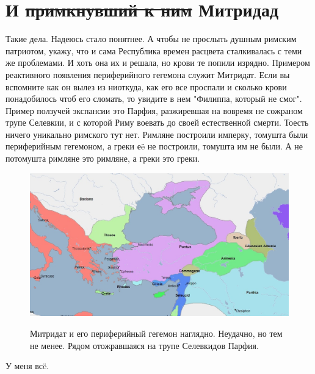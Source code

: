 \section{И \sout{примкнувший к ним} Митридад}
Такие дела. Надеюсь стало понятнее. А чтобы не прослыть душным римским патриотом, укажу, что и сама Республика времен расцвета сталкивалась с теми же проблемами. И хоть она их и решала, но крови те попили изрядно. Примером реактивного появления периферийного гегемона служит Митридат. Если вы вспомните как он вылез из ниоткуда, как его все проспали и сколько крови понадобилось чтоб его сломать, то увидите в нем "Филиппа, который не смог". Пример ползучей экспансии это Парфия, разжиревшая на вовремя не сожраном трупе Селевкии, и с которой Риму воевать до своей естественной смерти. Тоесть ничего уникально римского тут нет. Римляне построили имперку, томушта были периферийным гегемоном, а греки еë не построили, томушта им не были. А не потомушта римляне это римляне, а греки это греки.
\begin{figure}[h!tb]
	\centering\includegraphics[scale=0.3]{regional_hehemons/1613656552160570947.png}
	\label{fig:heh11} %
	\caption{Митридат и его периферийный гегемон наглядно. Неудачно, но тем не менее. Рядом отожравшаяся на трупе Селевкидов Парфия. }
\end{figure}

У меня всë. 